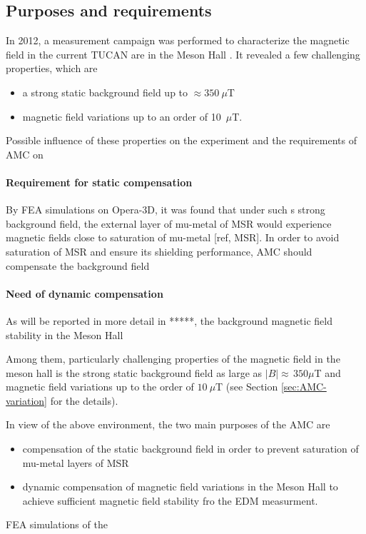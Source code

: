  
\subsection{Purposes and requirements}
In 2012, a measurement campaign was performed to characterize the magnetic field in the current TUCAN are in the Meson Hall \cite{Sarte}. It revealed a few challenging properties, which are 
\begin{itemize}
\item a strong static background field up to $\approx 350~\mu$T
\item magnetic field variations up to an order of 10~$\mu$T.
\end{itemize}
Possible influence of these properties on the experiment and the requirements of  AMC on 
\paragraph*{Requirement for static compensation }
By FEA simulations on Opera-3D, it was found that under such s strong background field, the external layer of mu-metal of MSR would experience magnetic fields close to saturation of mu-metal [ref, MSR]. In order to avoid saturation of MSR and ensure its shielding performance,  AMC should compensate the background field 
\paragraph*{Need of dynamic compensation }


As will be reported in more detail in *****, the background magnetic field stability in the Meson Hall 



Among them,  particularly challenging properties  of the magnetic field in the meson hall is the strong static background field as large as  $|B|\approx\,350\mu$T and magnetic field variations up to the  order of $10~\mu$T (see Section \ref{sec:AMC-variation} for the details).

In view of the above environment,  the two main purposes of the AMC  are
\begin{itemize}
\item compensation of the static background field in order to prevent saturation of mu-metal layers of MSR
\item dynamic compensation of magnetic field variations in the Meson Hall to achieve sufficient magnetic field stability fro the EDM measurment.
\end{itemize}
FEA simulations of the 

